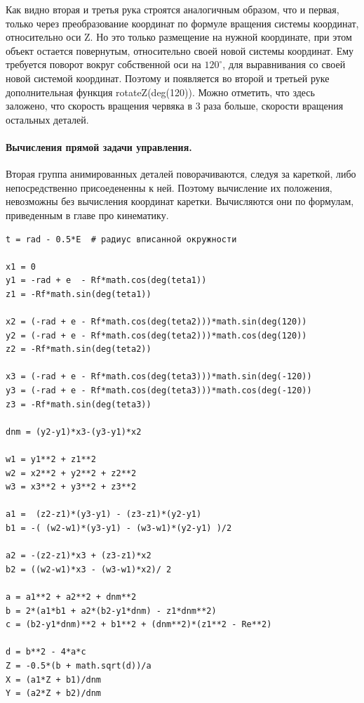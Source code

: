  Как видно вторая и третья рука строятся аналогичным образом, что и первая, только через преобразование координат по формуле вращения системы координат, относительно оси Z. Но это только размещение на нужной координате, при этом объект остается повернутым, относительно своей новой системы координат. Ему требуется поворот вокруг собственной оси на $120^{\circ}$, для выравнивания со своей новой системой координат. Поэтому и появляется во второй и третьей руке дополнительная функция rotateZ(deg(120)). Можно отметить, что здесь заложено, что скорость вращения червяка в 3 раза больше, скорости вращения остальных деталей.
 
 \paragraph{Вычисления прямой задачи управления.} Вторая группа анимированных деталей поворачиваются, следуя за кареткой, либо непосредственно присоедененны к ней. Поэтому вычисление их положения, невозможны без вычисления координат каретки. Вычисляются они по формулам, приведенным в главе про кинематику.
 
\begin{lstlisting}[style=python,caption=Решение прямой задачи управления дельта-робота]
t = rad - 0.5*E  # радиус вписанной окружности

x1 = 0
y1 = -rad + e  - Rf*math.cos(deg(teta1))
z1 = -Rf*math.sin(deg(teta1))

x2 = (-rad + e - Rf*math.cos(deg(teta2)))*math.sin(deg(120))
y2 = (-rad + e - Rf*math.cos(deg(teta2)))*math.cos(deg(120))
z2 = -Rf*math.sin(deg(teta2))

x3 = (-rad + e - Rf*math.cos(deg(teta3)))*math.sin(deg(-120))
y3 = (-rad + e - Rf*math.cos(deg(teta3)))*math.cos(deg(-120))
z3 = -Rf*math.sin(deg(teta3))

dnm = (y2-y1)*x3-(y3-y1)*x2

w1 = y1**2 + z1**2
w2 = x2**2 + y2**2 + z2**2
w3 = x3**2 + y3**2 + z3**2

a1 =  (z2-z1)*(y3-y1) - (z3-z1)*(y2-y1)
b1 = -( (w2-w1)*(y3-y1) - (w3-w1)*(y2-y1) )/2

a2 = -(z2-z1)*x3 + (z3-z1)*x2
b2 = ((w2-w1)*x3 - (w3-w1)*x2)/ 2

a = a1**2 + a2**2 + dnm**2
b = 2*(a1*b1 + a2*(b2-y1*dnm) - z1*dnm**2)
c = (b2-y1*dnm)**2 + b1**2 + (dnm**2)*(z1**2 - Re**2)

d = b**2 - 4*a*c
Z = -0.5*(b + math.sqrt(d))/a
X = (a1*Z + b1)/dnm
Y = (a2*Z + b2)/dnm

\end{lstlisting}

